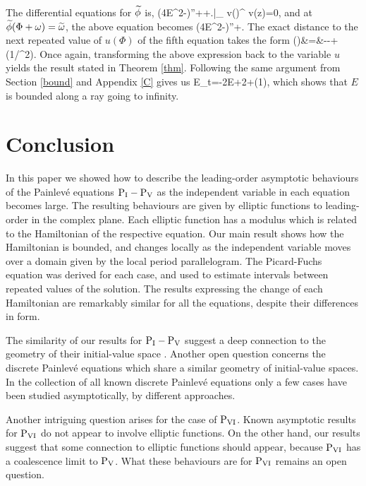 \documentclass[a4paper,reqno]{amsart}
\theoremstyle{definition}
\theoremstyle{remark}
\theoremstyle{theorem}
\numberwithin{equation}{section}
\begin{document}
\eeqn
The differential equations for $\widetilde{\phi}$ is,
\ben
\left(4E^2-\right)\phit''+\phit+\left.\right|_{ v(\Phi)}^{ v(z)}=0,
\een
and at $\widetilde{\phi}(\Phi+\omega)=\widetilde{\omega}$, the above equation becomes
\ben
\left(4E^2-\right)\omt''+.
\een
The exact distance to the next repeated value of $u(\Phi)$ of the fifth \pv equation takes the form
\beqn
\Om(\Phi)&=&\om--+\ord(1/\Phi^2).
\eeqn
Once again, transforming the above expression back to the variable $u$ yields the result stated in Theorem \ref{thm}. Following the same argument from Section \ref{bound} and Appendix \ref{C} gives us
\be
E_t=-2E+2+\ord(1),
\ee
which shows that $E$ is bounded along a ray going to infinity.

\section{Conclusion}
In this paper we showed how to describe the leading-order asymptotic behaviours of the Painlev\'e equations $\text{P$_{\text{I}}$}-\text{P$_{\text{V}}$}$ as the independent variable in each equation becomes large. The resulting behaviours are given by elliptic functions to leading-order in the complex plane. Each elliptic function has a modulus which is related to the Hamiltonian of the respective equation. Our main result shows how the Hamiltonian is bounded, and changes locally as the independent variable moves over a domain given by the local period parallelogram. The Picard-Fuchs equation was derived for each case, and used to estimate intervals between repeated values of the solution. The results expressing the change of each Hamiltonian are remarkably similar for all the equations, despite their differences in form.

The similarity of our results for $\text{P$_{\text{I}}$}-\text{P$_{\text{V}}$}$ suggest a deep connection to the geometry of their initial-value space \cite{O79}. Another open question concerns the discrete Painlev\'e equations which share a similar geometry of initial-value spaces. In the collection of all known discrete Painlev\'e equations only a few cases have been studied asymptotically, by different approaches.

Another intriguing question arises for the case of $\text{P$_{\text{VI}}$}$. Known asymptotic results for $\text{P$_{\text{VI}}$}$ do not appear to involve elliptic functions. On the other hand, our results suggest that some connection to elliptic functions should appear, because $\text{P$_{\text{VI}}$}$ has a coalescence limit to $\text{P$_{\text{V}}$}$. What these behaviours are for $\text{P$_{\text{VI}}$}$ remains an open question.
\end{document}
